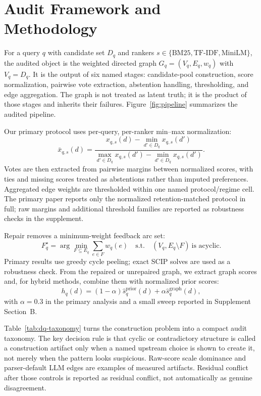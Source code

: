 \documentclass[acmsmall,anonymous,review]{acmart}
\begin{document}
\section{Audit Framework and Methodology}
\label{sec:methodology}

For a query $q$ with candidate set $D_q$ and rankers
$s \in \{\mathrm{BM25}, \mathrm{TF\mbox{-}IDF}, \mathrm{MiniLM}\}$, the
audited object is the weighted directed graph
$G_q=(V_q,E_q,w_q)$ with $V_q=D_q$. It is the output of six named stages:
candidate-pool construction, score normalization, pairwise vote extraction,
abstention handling, thresholding, and edge aggregation. The graph is not
treated as latent truth; it is the product of those stages and inherits
their failures. Figure~\ref{fig:pipeline} summarizes the audited pipeline.

Our primary protocol uses per-query, per-ranker min--max normalization:
\begin{equation}
\bar{x}_{q,s}(d)=
\frac{x_{q,s}(d)-\min_{d' \in D_q} x_{q,s}(d')}
     {\max_{d' \in D_q} x_{q,s}(d')-\min_{d' \in D_q} x_{q,s}(d')}.
\label{eq:minmax}
\end{equation}
Votes are then extracted from pairwise margins between normalized scores,
with ties and missing scores treated as abstentions rather than imputed
preferences. Aggregated edge weights are thresholded within one named
protocol/regime cell. The primary paper reports only the normalized
retention-matched protocol in full; raw margins and additional threshold
families are reported as robustness checks in the supplement.

Repair removes a minimum-weight feedback arc set:
\begin{equation}
F_q^\star=\arg\min_{F \subseteq E_q}
\sum_{e \in F} w_q(e)
\quad \text{s.t.}\quad (V_q,E_q \setminus F)\ \text{is acyclic}.
\label{eq:mwfas}
\end{equation}
Primary results use greedy cycle peeling; exact SCIP solves are used as a
robustness check. From the repaired or unrepaired graph, we extract graph
scores and, for hybrid methods, combine them with normalized prior scores:
\begin{equation}
h_q(d)=(1-\alpha)\hat{s}^{\mathrm{prior}}_q(d)+\alpha\hat{s}^{\mathrm{graph}}_q(d),
\label{eq:hybrid}
\end{equation}
with $\alpha=0.3$ in the primary analysis and a small sweep reported in
Supplement Section~B.

Table~\ref{tab:dq-taxonomy} turns the construction problem into a compact
audit taxonomy. The key decision rule is that cyclic or contradictory
structure is called a construction artifact only when a named upstream
choice is shown to create it, not merely when the pattern looks suspicious.
Raw-score scale dominance and parser-default LLM edges are examples of
measured artifacts. Residual conflict after those controls is reported as
residual conflict, not automatically as genuine disagreement.
\end{document}
